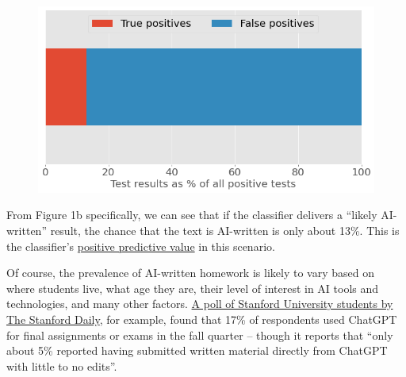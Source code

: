 \documentclass[
  letterpaper,
  DIV=11,
  numbers=noendperiod,
  oneside]{scrartcl}
\begin{document}

\begin{figure}

{\centering \includegraphics{fig1b.png}

}

\end{figure}


From Figure 1b specifically, we can see that if the classifier delivers
a ``likely AI-written'' result, the chance that the text is AI-written
is only about 13\%. This is the classifier's
\href{https://uk.cochrane.org/news/sensitivity-and-specificity-explained-cochrane-uk-trainees-blog}{positive
predictive value} in this scenario.

Of course, the prevalence of AI-written homework is likely to vary based
on where students live, what age they are, their level of interest in AI
tools and technologies, and many other factors.
\href{https://stanforddaily.com/2023/01/22/scores-of-stanford-students-used-chatgpt-on-final-exams-survey-suggests/}{A
poll of Stanford University students by The Stanford Daily}, for
example, found that 17\% of respondents used ChatGPT for final
assignments or exams in the fall quarter -- though it reports that
``only about 5\% reported having submitted written material directly
from ChatGPT with little to no edits''.
\end{document}
